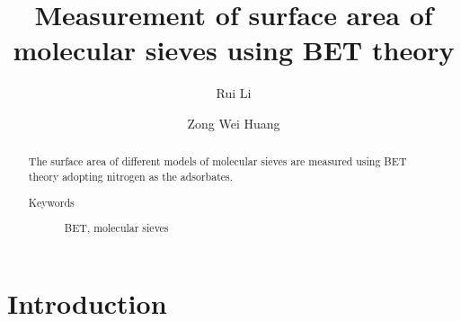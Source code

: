 \documentclass[%
 reprint,
 amsmath,amssymb,
 aps,
10.5pt,
]{revtex4-1}
\begin{document}

\title{Measurement of surface area of molecular sieves using BET theory}%

\author{Rui Li}
%


\author{Zong Wei Huang}
%



\begin{abstract}
The surface area of different models of molecular sieves are measured using BET theory adopting nitrogen as the adsorbates.
\begin{description}
\item[Keywords]
BET, molecular sieves
\end{description}
\end{abstract}

\maketitle

\tableofcontents

\section{Introduction}
\end{document}
